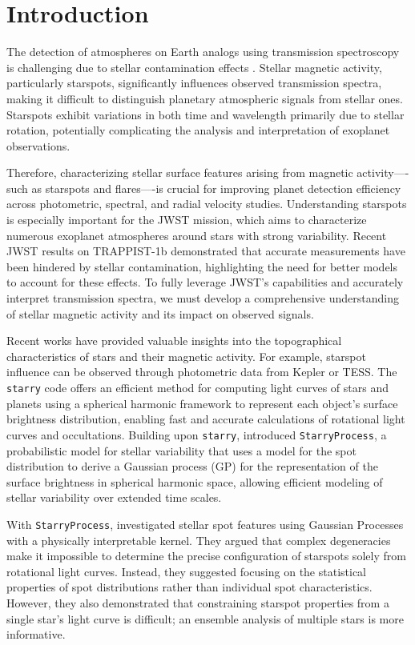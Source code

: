 \documentclass[twocolumn]{aastex631}
\newcommand{\sabinasays}[1]{{\color{purple}#1}}
\begin{document}
\section{Introduction}
\label{sec:intro}
The detection of atmospheres on Earth analogs using transmission spectroscopy is challenging due to stellar 
contamination effects \citep{Ducrot2018, Morris2018}. Stellar magnetic activity, particularly starspots, significantly 
influences observed transmission spectra, making it difficult to distinguish planetary atmospheric signals from stellar ones. 
Starspots exhibit variations in both time and wavelength primarily due to stellar rotation, potentially complicating the analysis 
and interpretation of exoplanet observations.

Therefore, characterizing stellar surface features arising from magnetic activity—-such as starspots and flares—-is crucial for 
improving planet detection efficiency across photometric, spectral, and radial velocity studies. Understanding starspots is 
especially important for the JWST mission, which aims to characterize numerous exoplanet atmospheres around stars with strong 
variability. Recent JWST results on TRAPPIST-1b \citep{Lim2023} demonstrated that accurate measurements have been 
hindered by stellar contamination, highlighting the need for better models to account for these effects. To fully leverage 
JWST's capabilities and accurately interpret transmission spectra, we must develop a comprehensive understanding of stellar 
magnetic activity and its impact on observed signals.

Recent works have provided valuable insights into the topographical
characteristics of stars and their magnetic activity. For example, starspot
influence can be observed through photometric data from Kepler or TESS. The
\texttt{starry} code \citep{Luger2019} offers an efficient method for computing
light curves of stars and planets using a spherical harmonic framework to
represent each object's surface brightness distribution,
enabling fast and accurate calculations of rotational light curves and
occultations. Building upon \texttt{starry}, \citet{Luger2021b} introduced
\texttt{StarryProcess}, a probabilistic model for stellar variability that
uses a model for the spot distribution
to derive a Gaussian process \sabinasays{(GP)} for the
representation of the surface brightness in spherical harmonic space, allowing
efficient modeling of stellar variability over extended time scales.

With \texttt{StarryProcess}, \citet{Luger2021b} investigated stellar spot
features using Gaussian Processes with a physically interpretable kernel. They
argued that complex degeneracies make it impossible to determine the precise
configuration of starspots solely from rotational light curves. Instead, they
suggested focusing on the statistical properties of spot distributions rather
than individual spot characteristics. However, they also demonstrated that
constraining starspot properties from a single star's light curve is difficult;
an ensemble analysis of multiple stars is more informative.
\end{document}
